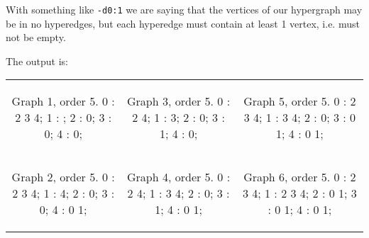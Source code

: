 With something like \texttt{-d0:1} we are saying that the vertices of our hypergraph may be in no hyperedges, but each hyperedge must contain at least 1 vertex, i.e. must not be empty.


The output is:

\begin{tabular}{|c|c|c|}
\begin{minipage}{1.5in}
\begin{output}
Graph 1, order 5.
  0 : 2 3 4;
  1 : ;
  2 : 0;
  3 : 0;
  4 : 0;

\end{output}
\end{minipage}

&

\begin{minipage}{1.5in}
\begin{output}
Graph 3, order 5.
  0 : 2 4;
  1 : 3;
  2 : 0;
  3 : 1;
  4 : 0;

\end{output}
\end{minipage}

&

\begin{minipage}{1.5in}
\begin{output}
Graph 5, order 5.
  0 : 2 3 4;
  1 : 3 4;
  2 : 0;
  3 : 0 1;
  4 : 0 1;

\end{output}
\end{minipage}

\\

\begin{minipage}{1.5in}
\begin{output}
Graph 2, order 5.
  0 : 2 3 4;
  1 : 4;
  2 : 0;
  3 : 0;
  4 : 0 1;

\end{output}
\end{minipage}

&

\begin{minipage}{1.5in}
\begin{output}
Graph 4, order 5.
  0 : 2 4;
  1 : 3 4;
  2 : 0;
  3 : 1;
  4 : 0 1;

\end{output}
\end{minipage}

&

\begin{minipage}{1.5in}
\begin{output}
Graph 6, order 5.
  0 : 2 3 4;
  1 : 2 3 4;
  2 : 0 1;
  3 : 0 1;
  4 : 0 1;
\end{output}
\end{minipage}

\\
\end{tabular}


